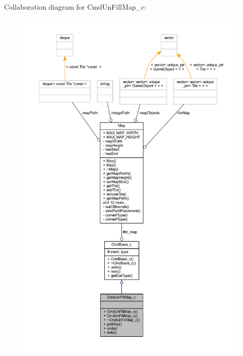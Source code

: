 Collaboration diagram for Cmd\+Un\+Fill\+Map\+\_\+c\+:\nopagebreak
\begin{figure}[H]
\begin{center}
\leavevmode
\includegraphics[width=350pt]{class_cmd_un_fill_map__c__coll__graph}
\end{center}
\end{figure}
